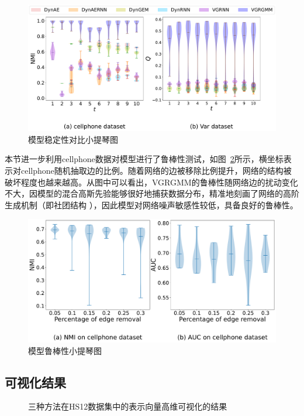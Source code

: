 \begin{figure}[htbp]
	\centering
	\includegraphics[width=.6\textwidth]{figures/chap06/STNQ.pdf}
	\caption{模型稳定性对比小提琴图}
	\label{fig:STNQ}
\end{figure}

本节进一步利用cellphone数据对模型进行了鲁棒性测试，如图~\ref{fig:robustWP}所示，横坐标表示对cellphone随机抽取边的比例。随着网络的边被移除比例提升，网络的结构被破坏程度也越来越高。从图中可以看出，VGRGMM的鲁棒性随网络边的扰动变化不大，因模型的混合高斯先验能够很好地捕获数据分布，精准地刻画了网络的高阶生成机制（即社团结构 ），因此模型对网络噪声敏感性较低，具备良好的鲁棒性。
\begin{figure}[htbp]
	\centering
	\includegraphics[width=.6\textwidth]{figures/chap06/workplaceRBNA.pdf}
	\caption{模型鲁棒性小提琴图}
	\label{fig:robustWP}
\end{figure}

\subsection{可视化结果}

\begin{figure}[htbp]
    \centering
    \caption{三种方法在HS12数据集中的表示向量高维可视化的结果}
    \label{fig:Visu}
\end{figure}

